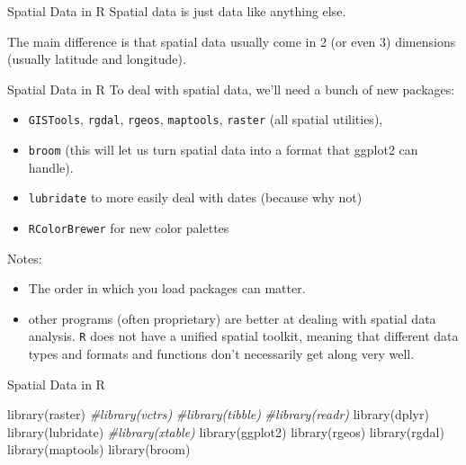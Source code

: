 \documentclass[
  ignorenonframetext,
]{beamer}
\newenvironment{Shaded}{\begin{snugshade}}{\end{snugshade}}
\newcommand{\CommentTok}[1]{\textcolor[rgb]{0.56,0.35,0.01}{\textit{#1}}}
\newcommand{\FunctionTok}[1]{\textcolor[rgb]{0.00,0.00,0.00}{#1}}
\newcommand{\NormalTok}[1]{#1}
\begin{document}
\begin{frame}{Spatial Data in R}
\protect\hypertarget{spatial-data-in-r-2}{}
Spatial data is just data like anything else.

The main difference is that spatial data usually come in 2 (or even 3)
dimensions (usually latitude and longitude).
\end{frame}

\begin{frame}[fragile]{Spatial Data in R}
\protect\hypertarget{spatial-data-in-r-3}{}
To deal with spatial data, we'll need a bunch of new packages:

\begin{itemize}
\item
  \texttt{GISTools}, \texttt{rgdal}, \texttt{rgeos}, \texttt{maptools},
  \texttt{raster} (all spatial utilities),
\item
  \texttt{broom} (this will let us turn spatial data into a format that
  ggplot2 can handle).
\item
  \texttt{lubridate} to more easily deal with dates (because why not)
\item
  \texttt{RColorBrewer} for new color palettes
\end{itemize}

Notes:

\begin{itemize}
\item
  The order in which you load packages can matter.
\item
  other programs (often proprietary) are better at dealing with spatial
  data analysis. \texttt{R} does not have a unified spatial toolkit,
  meaning that different data types and formats and functions don't
  necessarily get along very well.
\end{itemize}
\end{frame}

\begin{frame}[fragile]{Spatial Data in R}
\protect\hypertarget{spatial-data-in-r-4}{}
\begin{Shaded}
\begin{Highlighting}[]
\FunctionTok{library}\NormalTok{(raster)}
\CommentTok{\#library(vctrs)}
\CommentTok{\#library(tibble)}
\CommentTok{\#library(readr)}
\FunctionTok{library}\NormalTok{(dplyr)}
\FunctionTok{library}\NormalTok{(lubridate)}
\CommentTok{\#library(xtable)}
\FunctionTok{library}\NormalTok{(ggplot2)}
\FunctionTok{library}\NormalTok{(rgeos)}
\FunctionTok{library}\NormalTok{(rgdal)}
\FunctionTok{library}\NormalTok{(maptools)}
\FunctionTok{library}\NormalTok{(broom)}
\end{Highlighting}
\end{Shaded}
\end{frame}
\end{document}
